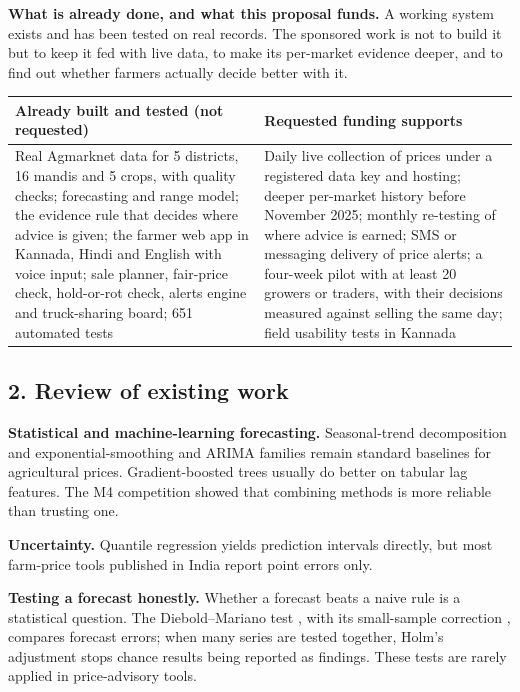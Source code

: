 \documentclass[11pt,a4paper]{article}
\begin{document}
\textbf{What is already done, and what this proposal funds.} A working system exists and has been tested on real records. The sponsored work is not to build it but to keep it fed with live data, to make its per-market evidence deeper, and to find out whether farmers actually decide better with it.

\begin{tabularx}{\textwidth}{@{}>{\raggedright\arraybackslash}X>{\raggedright\arraybackslash}X@{}}
\toprule
\textbf{Already built and tested (not requested)} & \textbf{Requested funding supports}\\
\midrule
Real Agmarknet data for 5 districts, 16 mandis and 5 crops, with quality checks; forecasting and range model; the evidence rule that decides where advice is given; the farmer web app in Kannada, Hindi and English with voice input; sale planner, fair-price check, hold-or-rot check, alerts engine and truck-sharing board; 651 automated tests &
Daily live collection of prices under a registered data key and hosting; deeper per-market history before November 2025; monthly re-testing of where advice is earned; SMS or messaging delivery of price alerts; a four-week pilot with at least 20 growers or traders, with their decisions measured against selling the same day; field usability tests in Kannada\\
\bottomrule
\end{tabularx}

\subsection*{2. Review of existing work}
\textbf{Statistical and machine-learning forecasting.} Seasonal-trend decomposition \cite{cleveland1990} and exponential-smoothing and ARIMA families \cite{hyndman2021} remain standard baselines for agricultural prices. Gradient-boosted trees \cite{chen2016} usually do better on tabular lag features. The M4 competition \cite{makridakis2020} showed that combining methods is more reliable than trusting one.

\textbf{Uncertainty.} Quantile regression \cite{koenker1978} yields prediction intervals directly, but most farm-price tools published in India report point errors only.

\textbf{Testing a forecast honestly.} Whether a forecast beats a naive rule is a statistical question. The Diebold--Mariano test \cite{diebold1995}, with its small-sample correction \cite{harvey1997}, compares forecast errors; when many series are tested together, Holm's adjustment \cite{holm1979} stops chance results being reported as findings. These tests are rarely applied in price-advisory tools.
\end{document}
